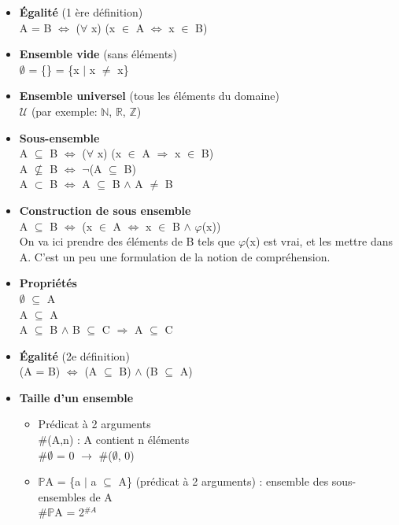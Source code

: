 \begin{itemize}
\item \textbf{Égalité} (1 ère définition) \\
A = B $\Leftrightarrow$ ($\forall$ x) (x $\in$ A $\Leftrightarrow$ x $\in$ B)\\
\item \textbf{Ensemble vide} (sans éléments)\\
$\emptyset$ = \{\} = \{x $\vert$ x $\neq$ x\}\\
\item \textbf{Ensemble universel} (tous les éléments du domaine)\\
$\mathcal{U}$ (par exemple: $\mathbb{N}$, $\mathbb{R}$, $\mathbb{Z}$)\\
\item \textbf{Sous-ensemble}\\
A $\subseteq$ B $\Leftrightarrow$ ($\forall$ x) (x $\in$ A $\Rightarrow$ x $\in$ B)\\
A $\nsubseteq$ B $\Leftrightarrow$ $\neg$(A $\subseteq$ B)\\
A $\subset$ B $\Leftrightarrow$ A $\subseteq$ B $\wedge$ A $\neq$ B\\
\item \textbf{Construction de sous ensemble} \\
A $\subseteq$ B $\Leftrightarrow$ (x $\in$ A $\Leftrightarrow$ x $\in$ B $\wedge$ $\varphi$(x))\\
On va ici prendre des éléments de B tels que $\varphi$(x) est vrai, et les mettre dans A. C'est un peu une formulation de la notion de compréhension.\\ 
\item \textbf{Propriétés}\\
$\emptyset$ $\subseteq$ A\\
A $\subseteq$ A\\
A $\subseteq$ B $\wedge$ B $\subseteq$ C $\Rightarrow$ A $\subseteq$ C \\
\item \textbf{Égalité} (2e définition)\\
(A = B) $\Leftrightarrow$ (A $\subseteq$ B) $\wedge$ (B $\subseteq$ A)\\
\item \textbf{Taille d'un ensemble} 
    \begin{itemize}
    \item Prédicat à 2 arguments\\
    \#(A,n) : A contient n éléments\\
    \#$\emptyset$ = 0  $\rightarrow$ \#($\emptyset$, 0) 
    \item $\mathbb{P}$A = \{a $\vert$ a $\subseteq$ A\} (prédicat à 2 arguments) : ensemble des sous-ensembles de A\\
    \#$\mathbb{P}$A = 2$^{\#A}$ \\
    \end{itemize}
\end{itemize}

